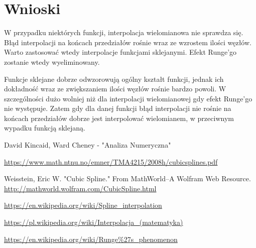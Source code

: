 \documentclass{article}
\begin{document}
	
\section{Wnioski}

W przypadku niektórych funkcji, interpolacja wielomianowa nie sprawdza się. Błąd interpolacji na końcach przedziałów rośnie wraz ze wzrostem ilości węzłów. Warto zastosować wtedy interpolacje funkcjami sklejanymi. Efekt Runge'go zostanie wtedy wyeliminowany. 

Funkcje sklejane dobrze odwzorowują ogólny kształt funkcji, jednak ich dokładność wraz ze zwiększaniem ilości węzłów rośnie bardzo powoli. W szczególności dużo wolniej niż dla interpolacji wielomianowej gdy efekt Runge'go nie występuje. Zatem gdy dla danej funkcji błąd interpolacji nie rośnie na końcach przedziałów dobrze jest interpolować wielomianem, w przeciwnym wypadku funkcją sklejaną.


\begin{thebibliography}{9}
	\itemsep2pt
			
	 David Kincaid, Ward Cheney - "Analiza Numeryczna"
	
	 \url{https://www.math.ntnu.no/emner/TMA4215/2008h/cubicsplines.pdf}
	
	 Weisstein, Eric W. "Cubic Spline." From MathWorld--A Wolfram Web Resource. \url{http://mathworld.wolfram.com/CubicSpline.html}
	
	 \url{https://en.wikipedia.org/wiki/Spline_interpolation}
	
	\url{https://pl.wikipedia.org/wiki/Interpolacja_(matematyka)}
	
	\url{https://en.wikipedia.org/wiki/Runge%27s_phenomenon}
	 
\end{thebibliography}
\end{document}
